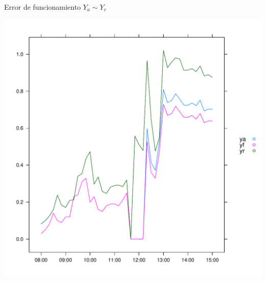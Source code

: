 \documentclass[aspectratio=169, usenames,svgnames,dvipsnames]{beamer}
\begin{document}
\begin{frame}[label={sec:org26dce0c}]{Error de funcionamiento \(Y_a \sim Y_r\)}
\begin{center}
\includegraphics[height=0.95\textheight]{../figs/ErrorMonitorizacion.pdf}
\end{center}
\end{frame}
\end{document}
